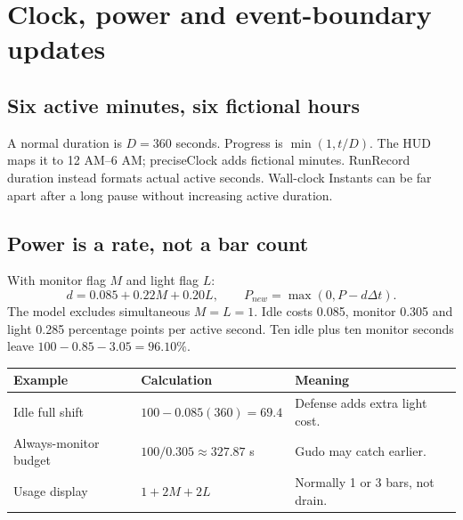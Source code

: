 \documentclass[11pt,a4paper]{article}
\begin{document}
\clearpage{}\label{p:rules}\section*{Clock, power and event-boundary updates}

\subsection*{Six active minutes, six fictional hours}
A normal duration is $D=360$ seconds. Progress is $\min(1,t/D)$. The HUD maps it to 12 AM--6 AM; preciseClock adds fictional minutes. RunRecord duration instead formats actual active seconds. Wall-clock Instants can be far apart after a long pause without increasing active duration.
\subsection*{Power is a rate, not a bar count}
With monitor flag $M$ and light flag $L$:
\[
 d=0.085+0.22M+0.20L,\qquad P_{new}=\max(0,P-d\Delta t).
\]
The model excludes simultaneous $M=L=1$. Idle costs 0.085, monitor 0.305 and light 0.285 percentage points per active second. Ten idle plus ten monitor seconds leave $100-0.85-3.05=96.10\%$.
\par\noindent\begin{tabularx}{\linewidth}{L{.23\linewidth}XL{.23\linewidth}}\toprule
\textbf{Example}&\textbf{Calculation}&\textbf{Meaning}\\\midrule
Idle full shift&$100-0.085(360)=69.4$&Defense adds extra light cost.\\
Always-monitor budget&$100/0.305\approx327.87$ s&Gudo may catch earlier.\\
Usage display&$1+2M+2L$&Normally 1 or 3 bars, not drain.\\\bottomrule\end{tabularx}\par
\end{document}
